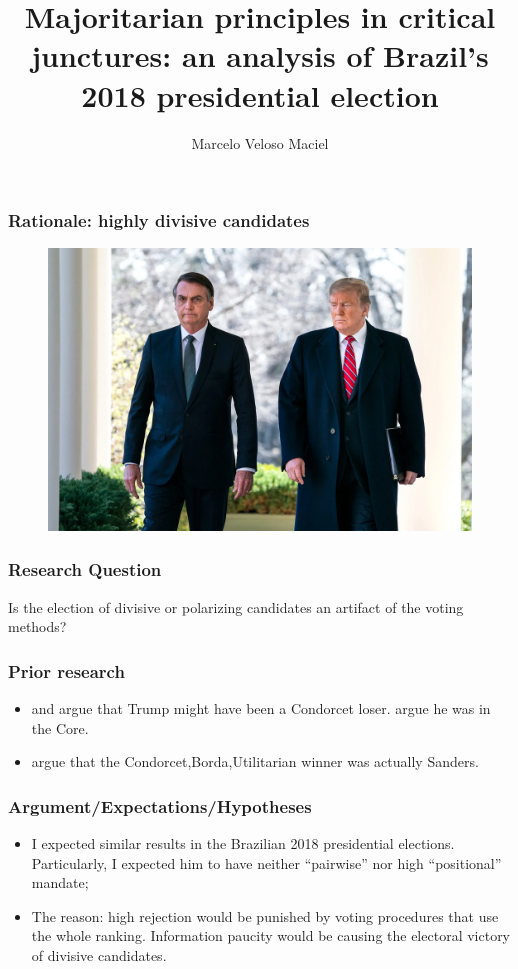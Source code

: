 \documentclass{beamer}
\title{Majoritarian principles in critical junctures: an analysis of Brazil's
  2018 presidential election}
\date{}
\author{Marcelo Veloso Maciel}
\institute{University of California, Irvine}
\begin{document}
\maketitle

\begin{frame}
\frametitle{Rationale: highly divisive candidates}
  \begin{figure}[H] \centering \includegraphics[width=\textwidth]{./trumpolnaro.png}
 \end{figure}
\end{frame}

\begin{frame}
  \frametitle{Research Question }
  Is the election of divisive or polarizing candidates an artifact of the voting
  methods?
\end{frame}

\begin{frame}
  \frametitle{Prior research}
  \begin{itemize}
    \item \textcite{potthoff2021condorcet} and \textcite{kurrild2018trump} argue
          that Trump might have been a Condorcet loser. \textcite{woon2020trump}
          argue he was in the Core.
    \item \textcite{igersheim22_compar_votin_method} argue that the Condorcet,Borda,Utilitarian winner was actually Sanders.
  \end{itemize}
\end{frame}

\begin{frame}
  \frametitle{Argument/Expectations/Hypotheses}
  \begin{itemize}
    \item I expected similar results in the Brazilian 2018 presidential
          elections. Particularly, I expected him to have neither ``pairwise''
          nor high ``positional'' mandate;
    \item The reason: high rejection would be punished by voting procedures that use the whole ranking. Information paucity would be causing the electoral victory of divisive candidates.
  \end{itemize}
\end{frame}
\end{document}

